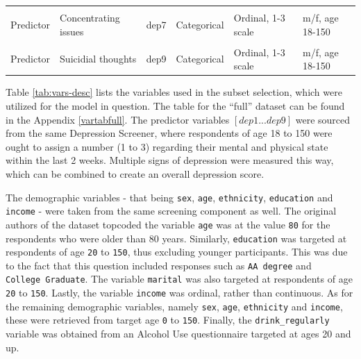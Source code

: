 \documentclass[
]{article}
\begin{document}
\begin{table}[!h]
{\begin{tabular}[t]{llllll}
\cellcolor{gray!6}{Predictor} & \cellcolor{gray!6}{Feeling bad about yourself} & \cellcolor{gray!6}{dep6} & \cellcolor{gray!6}{Categorical} & \cellcolor{gray!6}{Ordinal, 1-3 scale} & \cellcolor{gray!6}{m/f, age 18-150}\\
Predictor & Concentrating issues & dep7 & Categorical & Ordinal, 1-3 scale & m/f, age 18-150\\
\cellcolor{gray!6}{Predictor} & \cellcolor{gray!6}{Moving and speaking issues} & \cellcolor{gray!6}{dep8} & \cellcolor{gray!6}{Categorical} & \cellcolor{gray!6}{Ordinal, 1-3 scale} & \cellcolor{gray!6}{m/f, age 18-150}\\
\addlinespace
Predictor & Suicidial thoughts & dep9 & Categorical & Ordinal, 1-3 scale & m/f, age 18-150\\
\bottomrule
\end{tabular}}
\end{table}

Table \ref{tab:vars-desc} lists the variables used in the subset selection, which were utilized for the model in question. The table for the ``full'' dataset can be found in the Appendix \ref{vartabfull}.
The predictor variables \([dep1...dep9]\) were sourced from the same Depression Screener, where respondents of age 18 to 150 were ought to assign a number (1 to 3) regarding their mental and physical state within the last 2 weeks. Multiple signs of depression were measured this way, which can be combined to create an overall depression score.

The demographic variables - that being \texttt{sex}, \texttt{age}, \texttt{ethnicity}, \texttt{education} and \texttt{income} - were taken from the same screening component as well. The original authors of the dataset topcoded the variable \texttt{age} was at the value \texttt{80} for the respondents who were older than 80 years. Similarly, \texttt{education} was targeted at respondents of age \texttt{20} to \texttt{150}, thus excluding younger participants. This was due to the fact that this question included responses such as \texttt{AA\ degree} and \texttt{College\ Graduate}. The variable \texttt{marital} was also targeted at respondents of age \texttt{20} to \texttt{150}. Lastly, the variable \texttt{income} was ordinal, rather than continuous. As for the remaining demographic variables, namely \texttt{sex}, \texttt{age}, \texttt{ethnicity} and \texttt{income}, these were retrieved from target age \texttt{0} to \texttt{150}. Finally, the \texttt{drink\_regularly} variable was obtained from an Alcohol Use questionnaire targeted at ages 20 and up.
\end{document}
